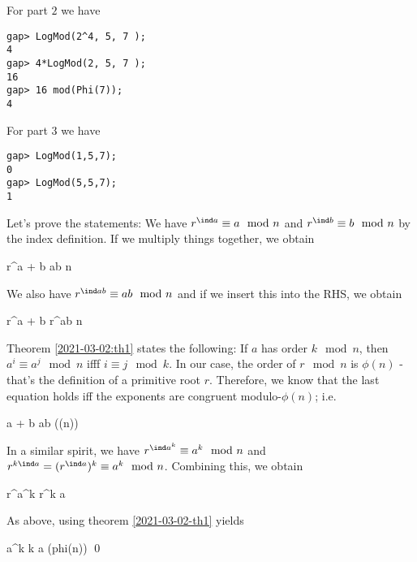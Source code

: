 For part $2$ we have

\begin{verbatim}
gap> LogMod(2^4, 5, 7 );
4
gap> 4*LogMod(2, 5, 7 );
16
gap> 16 mod(Phi(7));
4
\end{verbatim}

For part 3 we have

\begin{verbatim}
gap> LogMod(1,5,7);
0
gap> LogMod(5,5,7);
1
\end{verbatim}

Let's prove the statements: We have $r^{\ind a} \equiv a \mod n$ and $r^{\ind b} \equiv b \mod n$ by the index definition. If we multiply things together, we obtain

\bee
r^{\ind a + \ind b} \equiv ab \mod n
\eee

We also have $r^{\ind ab} \equiv ab \mod n$ and if we insert this into the RHS, we obtain

\bee
r^{\ind a + \ind b} \equiv r^{\ind ab} \mod n
\eee


Theorem \ref{2021-03-02:th1} states the following: If $a$ has order $k \mod n$, then $a^i \equiv a^j \mod n$ ifff $i \equiv j \mod k$. In our case, the order of $r \mod n$ is $\phi(n)$ - that's the definition of a primitive root $r$. Therefore, we know that the last equation holds iff the exponents are congruent modulo-$\phi(n)$; i.e.

\bee
\ind a + \ind b \equiv \ind ab \mod(\phi(n))
\eee

In a similar spirit, we have $r^{\ind a^k} \equiv a^k \mod n$ and $r^{k \ind a} = (r^{\ind a})^k \equiv a^k \mod n$. Combining this, we obtain

\bee
r^{\ind a^k} \equiv r^{k \ind a}
\eee

As above, using theorem \ref{2021-03-02-th1} yields

\bee
\ind a^k \equiv k \ind a \mod(phi(n)) \qed
\eee

